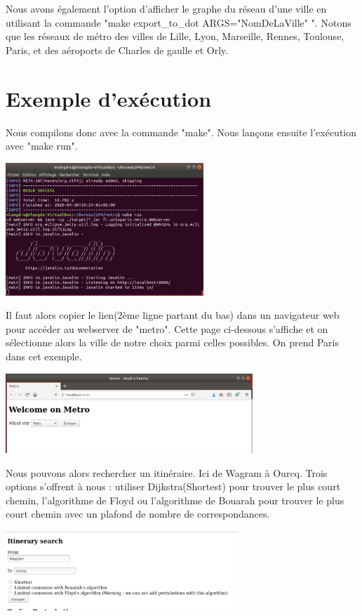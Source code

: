 \documentclass[12pt,french]{article}
\begin{document}
Nous avons également l'option d'afficher le graphe du réseau d'une ville en utilisant la commande "make export\_to\_dot ARGS="NomDeLaVille" ". Notons que les réseaux de métro des villes de Lille, Lyon, Marseille, Rennes, Toulouse, Paris, et des aéroports de Charles de gaulle et Orly.

\section{Exemple d'exécution}
Nous compilons donc avec la commande "make".
Nous lançons ensuite l'exécution avec "make run".

\includegraphics[height=5cm]{images/execute.png}

Il faut alors copier le lien(2ème ligne partant du bas) dans un navigateur web pour accéder au webserver de "metro". Cette page ci-dessous s'affiche et on sélectionne alors la ville de notre choix parmi celles possibles. On prend Paris dans cet exemple.

\includegraphics[height=3cm]{images/pageDAccueil.png}

Nous pouvons alors rechercher un itinéraire. Ici de Wagram à Ourcq. Trois options s'offrent à nous : utiliser Dijkstra(Shortest) pour trouver le plus court chemin, l'algorithme de Floyd ou l'algorithme de Bouarah pour trouver le plus court chemin avec un plafond de nombre de correspondances.

\includegraphics[height=3cm]{images/research.png}
\end{document}
